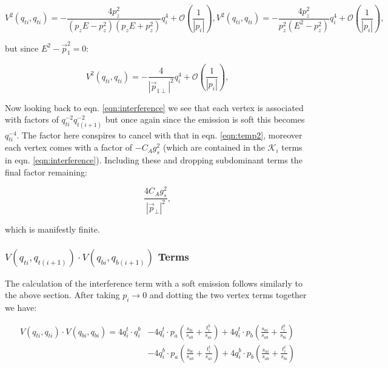 			\begin{subequations}
				\begin{equation}
				V^2(q_{ti}, q_{ti}) = - \frac{4p_z^2}{(p_zE - p_z^2)(p_zE + p_z^2)}q^4_{i} + \mathcal{O}\left(\frac{1}{|p_i|}\right),
				\end{equation}
				\begin{equation}
				V^2(q_{ti}, q_{ti}) = - \frac{4p_z^2}{p_z^2(E^2-p_z^2)}q^4_{i} + \mathcal{O}\left(\frac{1}{|p_i|}\right),
				\end{equation}
			\end{subequations}

			but since $E^2-\vec{p}_1^2=0$:

			\begin{equation}
				V^2(q_{ti}, q_{ti}) = - \frac{4}{|\vec{p}_{1\perp}|^2}q^4_{i} + \mathcal{O}\left(\frac{1}{|p_i|}\right),
				\label{eqn:temp2}
			\end{equation}

			Now looking back to eqn. \eqref{eqn:interference} we see that each vertex is associated with factors of
			$q^{-2}_{ti}q^{-2}_{t(i+1)}$ but once again since the emission is soft this becomes $q^{-4}_{ti}$.
			The factor here conspires to cancel with that in eqn. \eqref{eqn:temp2}, moreover each vertex comes with a
			factor of $-C_Ag^2_s$ (which are contained in the $\mathcal{K}_i$ terms in eqn. \eqref{eqn:interference}).
			Including these and dropping subdominant terms the final factor remaining:

			\begin{equation}
				\frac{4C_Ag_s^2}{|\vec{p}_\perp|^2},
				\label{eqn:finalsoft}
			\end{equation}

			which is manifestly finite.

		\subsubsection{$V(q_{ti}, q_{t(i+1)})\cdot V(q_{bi}, q_{b(i+1)})$ Terms}
			\label{sub:subsection_name}

			The calculation of the interference term with a soft emission follows similarly to the above section.
			After taking $p_i\rightarrow0$ and dotting the two vertex terms together we have:

			\begin{equation}
			\begin{split}
				V(q_{ti}, q_{ti})\cdot V(q_{bi}, q_{bi}) = 4q_i^t\cdot q_i^b &- 4q_i^t\cdot p_a\left(\frac{s_{bi}}{s_{ab}} +
					\frac{t_i^b}{s_{ai}}\right) + 4q_i^t\cdot p_b\left(\frac{s_{ai}}{s_{ab}} + \frac{t_i^b}{s_{bi}}\right)\\
					&- 4q_i^b\cdot p_a\left(\frac{s_{bi}}{s_{ab}} + \frac{t_i^t}{s_{ai}}\right) +
					4q_i^b\cdot p_b\left(\frac{s_{ai}}{s_{ab}} +
					\frac{t_i^t}{s_{bi}}\right)\\
			\end{split}
			\end{equation}


